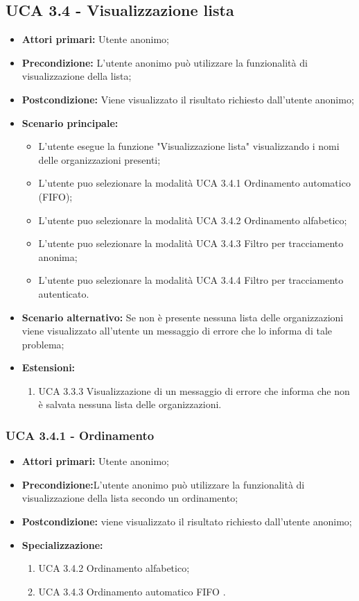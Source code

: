 \subsection{UCA 3.4 - Visualizzazione lista}%

\begin{itemize} 
	\item \textbf{Attori primari:} Utente anonimo;
	\item \textbf{Precondizione:} L’utente anonimo può utilizzare la funzionalità di visualizzazione della lista;
	\item \textbf{Postcondizione:} Viene visualizzato il risultato richiesto dall’utente anonimo;
	\item \textbf{Scenario principale:}	
	\begin{itemize}
		\item L’utente esegue la funzione "Visualizzazione lista" visualizzando i nomi delle organizzazioni presenti;
		\item L'utente puo selezionare la modalità UCA 3.4.1 Ordinamento automatico (FIFO);
		\item L'utente puo selezionare la modalità UCA 3.4.2 Ordinamento alfabetico;
		\item L'utente puo selezionare la modalità UCA 3.4.3 Filtro per tracciamento anonima;
		\item L'utente puo selezionare la modalità UCA 3.4.4 Filtro per tracciamento autenticato.
	\end{itemize}
	\item \textbf{Scenario alternativo:} Se non è presente nessuna lista delle organizzazioni viene visualizzato all’utente un messaggio di errore che lo informa di tale problema;
	\item \textbf{Estensioni:}
	\begin{enumerate}
		\item UCA 3.3.3 Visualizzazione di un messaggio di errore che informa che non è salvata nessuna lista delle organizzazioni.
	\end{enumerate}
\end{itemize}

\subsubsection{UCA 3.4.1 - Ordinamento}%
\begin{itemize}
	\item \textbf{Attori primari:} Utente anonimo;
	\item \textbf{Precondizione:}L’utente anonimo può utilizzare la funzionalità di visualizzazione della lista secondo un ordinamento;
	\item \textbf{Postcondizione:} viene visualizzato il risultato richiesto dall’utente anonimo;
	\item \textbf{Specializzazione:}
	\begin{enumerate}
		\item UCA 3.4.2 Ordinamento alfabetico;
		\item UCA 3.4.3 Ordinamento automatico FIFO .
	\end{enumerate}
\end{itemize}

